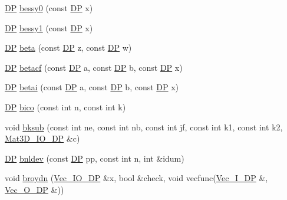 \begin{DoxyCompactItemize}
\mbox{\hyperlink{namespaceNR_af6ff762dd605ff477b8e52387253a02a}{DP}} \mbox{\hyperlink{namespaceNR_ae31454cfbd454b6de0460f0e08ef933b}{bessy0}} (const \mbox{\hyperlink{namespaceNR_af6ff762dd605ff477b8e52387253a02a}{DP}} x)
\item 
\mbox{\hyperlink{namespaceNR_af6ff762dd605ff477b8e52387253a02a}{DP}} \mbox{\hyperlink{namespaceNR_ae507795ea35c6716c6bf449c48af314f}{bessy1}} (const \mbox{\hyperlink{namespaceNR_af6ff762dd605ff477b8e52387253a02a}{DP}} x)
\item 
\mbox{\hyperlink{namespaceNR_af6ff762dd605ff477b8e52387253a02a}{DP}} \mbox{\hyperlink{namespaceNR_a060c1496967431dfd707b603985a33b7}{beta}} (const \mbox{\hyperlink{namespaceNR_af6ff762dd605ff477b8e52387253a02a}{DP}} z, const \mbox{\hyperlink{namespaceNR_af6ff762dd605ff477b8e52387253a02a}{DP}} w)
\item 
\mbox{\hyperlink{namespaceNR_af6ff762dd605ff477b8e52387253a02a}{DP}} \mbox{\hyperlink{namespaceNR_a52e6dba4373484f23464637a58c46c39}{betacf}} (const \mbox{\hyperlink{namespaceNR_af6ff762dd605ff477b8e52387253a02a}{DP}} a, const \mbox{\hyperlink{namespaceNR_af6ff762dd605ff477b8e52387253a02a}{DP}} b, const \mbox{\hyperlink{namespaceNR_af6ff762dd605ff477b8e52387253a02a}{DP}} x)
\item 
\mbox{\hyperlink{namespaceNR_af6ff762dd605ff477b8e52387253a02a}{DP}} \mbox{\hyperlink{namespaceNR_a462b09f1ae76391cfc50c8a032259b8a}{betai}} (const \mbox{\hyperlink{namespaceNR_af6ff762dd605ff477b8e52387253a02a}{DP}} a, const \mbox{\hyperlink{namespaceNR_af6ff762dd605ff477b8e52387253a02a}{DP}} b, const \mbox{\hyperlink{namespaceNR_af6ff762dd605ff477b8e52387253a02a}{DP}} x)
\item 
\mbox{\hyperlink{namespaceNR_af6ff762dd605ff477b8e52387253a02a}{DP}} \mbox{\hyperlink{namespaceNR_a35306d0e713b54e50ad6bfdeca55d162}{bico}} (const int n, const int k)
\item 
void \mbox{\hyperlink{namespaceNR_a16bf04bccb961bc7c1f0a1aa65d849ea}{bksub}} (const int ne, const int nb, const int jf, const int k1, const int k2, \mbox{\hyperlink{namespaceNR_ae2c061d1bcce9ea856c905d761956d76}{Mat3\+D\+\_\+\+I\+O\+\_\+\+DP}} \&c)
\item 
\mbox{\hyperlink{namespaceNR_af6ff762dd605ff477b8e52387253a02a}{DP}} \mbox{\hyperlink{namespaceNR_aa9a538f63c380caf2e72b8d6f4bdbe3e}{bnldev}} (const \mbox{\hyperlink{namespaceNR_af6ff762dd605ff477b8e52387253a02a}{DP}} pp, const int n, int \&idum)
\item 
void \mbox{\hyperlink{namespaceNR_a11b0d45adeba8de27502be58cc893210}{broydn}} (\mbox{\hyperlink{namespaceNR_ab293e06a6bf799d8a7ed932b6852bcb8}{Vec\+\_\+\+I\+O\+\_\+\+DP}} \&x, bool \&check, void vecfunc(\mbox{\hyperlink{namespaceNR_a9f943da53862537c552e2a770cb170ae}{Vec\+\_\+\+I\+\_\+\+DP}} \&, \mbox{\hyperlink{namespaceNR_a970094d23441f8ef6a45282a7eb2103d}{Vec\+\_\+\+O\+\_\+\+DP}} \&))

\end{DoxyCompactItemize}
